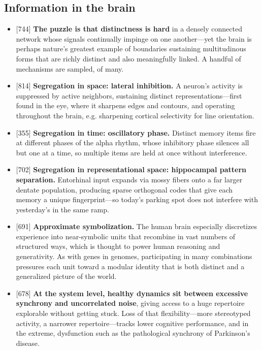 \documentclass[11pt]{article}
\newcommand{\ct}[1]{{\footnotesize\color{black!55}[#1]}\hspace{1pt}}
\begin{document}
\subsection{Information in the brain}

\begin{itemize}
  \item \ct{744} \textbf{The puzzle is that distinctness is hard} in a densely connected network whose signals continually impinge on one another---yet the brain is perhaps nature's greatest example of boundaries sustaining multitudinous forms that are richly distinct and also meaningfully linked. A handful of mechanisms are sampled, of many.
  \item \ct{814} \textbf{Segregation in space: lateral inhibition.} A neuron's activity is suppressed by active neighbors, sustaining distinct representations---first found in the eye, where it sharpens edges and contours, and operating throughout the brain, e.g. sharpening cortical selectivity for line orientation.
  \item \ct{355} \textbf{Segregation in time: oscillatory phase.} Distinct memory items fire at different phases of the alpha rhythm, whose inhibitory phase silences all but one at a time, so multiple items are held at once without interference.
  \item \ct{702} \textbf{Segregation in representational space: hippocampal pattern separation.} Entorhinal input expands via mossy fibers onto a far larger dentate population, producing sparse orthogonal codes that give each memory a unique fingerprint---so today's parking spot does not interfere with yesterday's in the same ramp.
  \item \ct{691} \textbf{Approximate symbolization.} The human brain especially discretizes experience into near-symbolic units that recombine in vast numbers of structured ways, which is thought to power human reasoning and generativity. As with genes in genomes, participating in many combinations pressures each unit toward a modular identity that is both distinct and a generalized picture of the world.
  \item \ct{678} \textbf{At the system level, healthy dynamics sit between excessive synchrony and uncorrelated noise}, giving access to a huge repertoire explorable without getting stuck. Loss of that flexibility---more stereotyped activity, a narrower repertoire---tracks lower cognitive performance, and in the extreme, dysfunction such as the pathological synchrony of Parkinson's disease.
\end{itemize}
\end{document}
